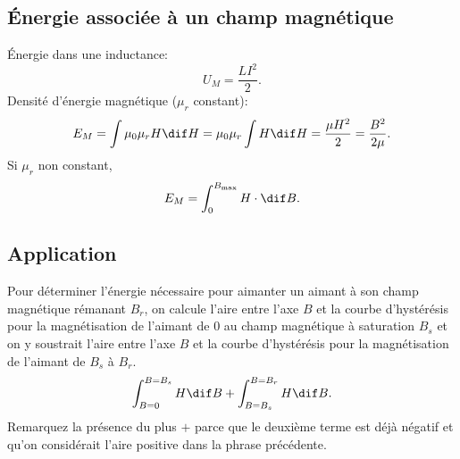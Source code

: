 \subsection{Énergie associée à un champ magnétique}
Énergie dans une inductance:
\[ U_M = \frac{LI^2}{2}. \]
Densité d'énergie magnétique ($\mu_r$ constant):
\[ E_M = \int \mu_0 \mu_r H \dif H = \mu_0 \mu_r \int H \dif H
= \frac{\mu H^2}{2} = \frac{B^2}{2\mu}. \]
Si $\mu_r$ non constant,
\[ E_M = \int_0^{B_\mathrm{max}} H \cdot \dif B. \]

\subsection{Application}
Pour déterminer l'énergie nécessaire pour aimanter
un aimant à son champ magnétique rémanant $B_r$,
on calcule l'aire entre l'axe $B$ et la courbe d'hystérésis
pour la magnétisation de l'aimant de 0 au champ magnétique à saturation
$B_s$ et on y soustrait l'aire entre l'axe $B$
et la courbe d'hystérésis pour la magnétisation de l'aimant de $B_s$ à $B_r$.
\[ \int_{B = 0}^{B = B_s} H \dif B + \int_{B = B_s}^{B = B_r} H \dif B. \]
Remarquez la présence du plus $+$ parce que le deuxième terme est déjà négatif
et qu'on considérait l'aire positive dans la phrase précédente.

